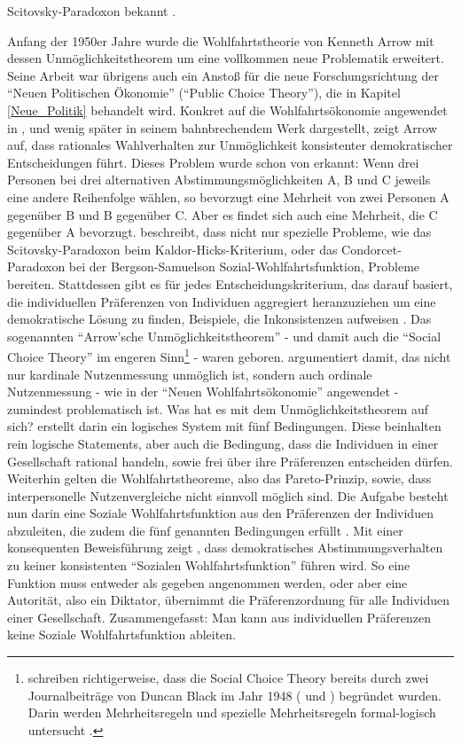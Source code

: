 Scitovsky-Paradoxon bekannt \parencite[S. 12]{Suzumura2016}.

Anfang der 1950er Jahre wurde die Wohlfahrtstheorie von Kenneth Arrow mit dessen Unmöglichkeitstheorem um eine vollkommen neue Problematik erweitert. Seine Arbeit war übrigens auch ein Anstoß für die neue Forschungsrichtung der "`Neuen Politischen Ökonomie"' ("`Public Choice Theory"'), die in Kapitel \ref{Neue_Politik} behandelt wird. Konkret auf die Wohlfahrtsökonomie angewendet in \textcite[S. 329]{Arrow1950}, und wenig später in seinem bahnbrechendem Werk \parencite{Arrow1951} dargestellt, zeigt Arrow auf, dass rationales Wahlverhalten zur Unmöglichkeit konsistenter demokratischer Entscheidungen führt. Dieses Problem wurde schon von \textcite{Condorcet1785} erkannt: Wenn drei Personen bei drei alternativen Abstimmungsmöglichkeiten A, B und C jeweils eine andere Reihenfolge wählen, so bevorzugt eine Mehrheit von zwei Personen A gegenüber B und B gegenüber C. Aber es findet sich auch eine Mehrheit, die C gegenüber A bevorzugt. \textcite{Arrow1950} beschreibt, dass nicht nur spezielle Probleme, wie das Scitovsky-Paradoxon beim Kaldor-Hicks-Kriterium, oder das Condorcet-Paradoxon bei der Bergson-Samuelson Sozial-Wohlfahrtsfunktion, Probleme bereiten. Stattdessen gibt es für jedes Entscheidungskriterium, das darauf basiert, die individuellen Präferenzen von Individuen aggregiert heranzuziehen um eine demokratische Lösung zu finden, Beispiele, die Inkonsistenzen aufweisen \parencite[S. 330]{Arrow1950}. Das sogenannten "`Arrow'sche Unmöglichkeitstheorem"' - und damit auch die "`Social Choice Theory"' im engeren Sinn\footnote{\textcite{Fleurbaey2021} schreiben richtigerweise, dass die Social Choice Theory bereits durch zwei Journalbeiträge von Duncan Black im Jahr 1948 (\textcite{Black1948a} und \textcite{Black1948b}) begründet wurden. Darin werden Mehrheitsregeln und spezielle Mehrheitsregeln formal-logisch untersucht \parencite{Fleurbaey2021}.} - waren geboren. \textcite{Arrow1950} argumentiert damit, das nicht nur kardinale Nutzenmessung unmöglich ist, sondern auch ordinale Nutzenmessung - wie in der "`Neuen Wohlfahrtsökonomie"' angewendet - zumindest problematisch ist. Was hat es mit dem Unmöglichkeitstheorem auf sich? \textcite{Arrow1950} erstellt darin ein logisches System mit fünf Bedingungen. Diese beinhalten rein logische Statements, aber auch die Bedingung, dass die Individuen in einer Gesellschaft rational handeln, sowie frei über ihre Präferenzen entscheiden dürfen. Weiterhin gelten die Wohlfahrtstheoreme, also das Pareto-Prinzip, sowie, dass  interpersonelle Nutzenvergleiche nicht sinnvoll möglich sind. Die Aufgabe besteht nun darin eine Soziale Wohlfahrtsfunktion aus den Präferenzen der Individuen abzuleiten, die zudem die fünf genannten Bedingungen erfüllt \parencite[S. 339]{Arrow1950}. Mit einer konsequenten Beweisführung zeigt \textcite[S. 339ff]{Arrow1950}, dass demokratisches Abstimmungsverhalten zu keiner konsistenten "`Sozialen Wohlfahrtsfunktion"' führen wird. So eine Funktion muss entweder als gegeben angenommen werden, oder aber eine Autorität, also ein Diktator, übernimmt die Präferenzordnung für alle Individuen einer Gesellschaft. Zusammengefasst: Man kann aus individuellen Präferenzen keine Soziale Wohlfahrtsfunktion ableiten. 